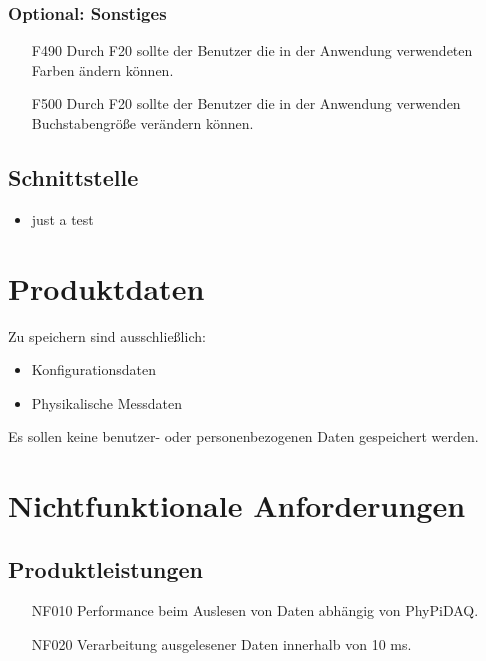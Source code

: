 \documentclass[parskip=full]{scrartcl}
\begin{document}
\subsubsection{Optional: Sonstiges}

\begin{itemize}

\item[F490] Durch F20 sollte der Benutzer die in der Anwendung verwendeten Farben ändern können.
\item[F500] Durch F20 sollte der Benutzer die in der Anwendung verwenden Buchstabengröße verändern können.

\end{itemize}

\subsection{Schnittstelle}

\begin{itemize}
\item just a test

\end{itemize}

\section{Produktdaten}

Zu speichern sind ausschließlich:

\begin{itemize}

\item Konfigurationsdaten
\item Physikalische Messdaten

\end{itemize}

Es sollen keine benutzer- oder personenbezogenen Daten gespeichert werden.

\section{Nichtfunktionale Anforderungen}

\subsection{Produktleistungen}

\begin{itemize}

\item[NF010] Performance beim Auslesen von Daten abhängig von PhyPiDAQ.
\item[NF020] Verarbeitung ausgelesener Daten innerhalb von 10 ms.

\end{itemize}
\end{document}
